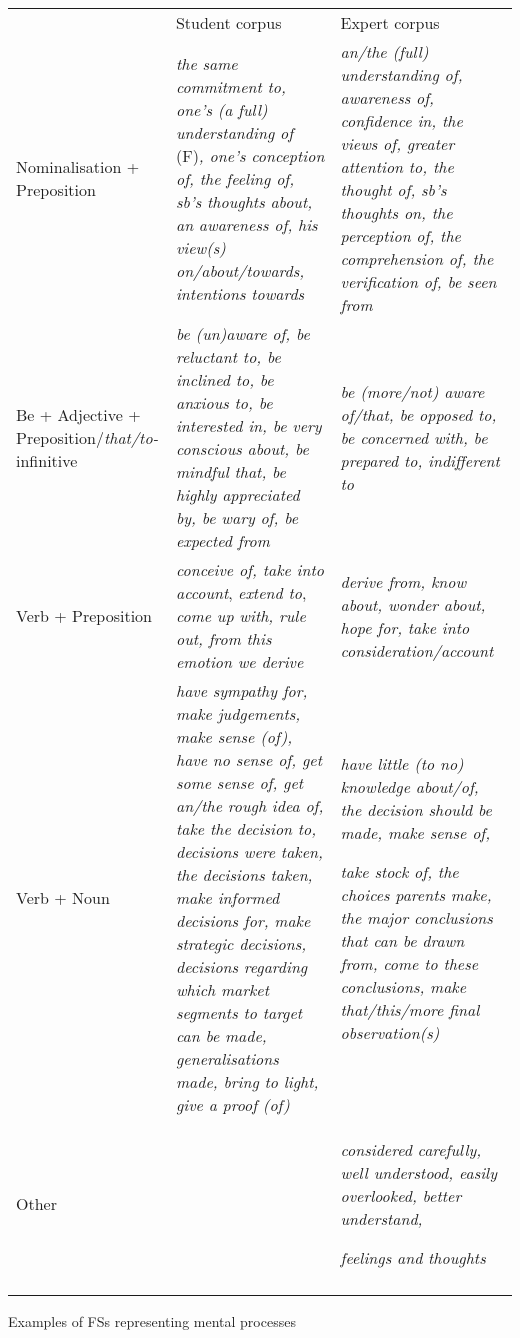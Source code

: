 \begin{tabularx}{\textwidth}{XXX} & Student corpus & Expert corpus\\

\lsptoprule
Nominalisation + Preposition & \textit{the same commitment to, one’s (a full) understanding of} (F)\textit{, one’s conception of, the feeling of, sb’s thoughts about, an awareness of, his view(s) on/about/towards, intentions towards} & \textit{an/the (full) understanding of, awareness of, confidence in, the views of, greater attention to, the thought of, sb’s thoughts on, the perception of, the comprehension of, the verification of, be seen from}\\
Be + Adjective + Preposition/\textit{that/to-}infinitive & \textit{be (un)aware of, be reluctant to, be inclined to, be anxious to, be interested in, be very conscious about, be mindful that, be highly appreciated by, be wary of, be expected from} & \textit{be (more/not) aware of/that, be opposed to, be concerned with, be prepared to, indifferent to}\\
Verb + Preposition & \textit{conceive of, take into account}, \textit{extend to}, \textit{come up with, rule out, from this emotion we derive} & \textit{derive from, know about, wonder about, hope for, take into consideration/account}\\
Verb + Noun & \textit{have sympathy for, make judgements, make sense (of), have no sense of, get some sense of, get an/the rough idea of, take the decision to, decisions were taken, the decisions taken, make informed decisions for, make strategic decisions, decisions regarding which market segments to target can be made, generalisations made, bring to light, give a proof (of)} & \textit{have little (to no) knowledge about/of, the decision should be made, make sense of,}

\textit{take stock of, the choices parents make, the major conclusions that can be drawn from, come to these conclusions, make that/this/more final observation(s)}\\
Other &  & \textit{considered carefully, well understood, easily overlooked, better understand,}

\textit{feelings and thoughts}\\
\lspbottomrule
\end{tabularx}
\begin{table}
\caption{Examples of FSs representing mental processes}
\label{tab:key:6}
\end{table}

